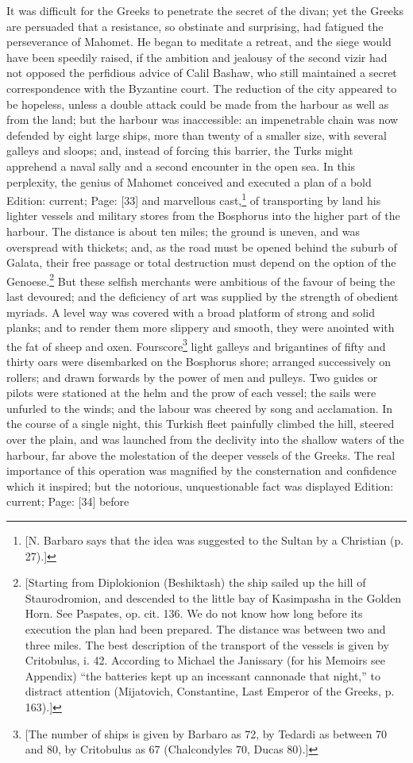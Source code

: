 It was difficult for the Greeks to penetrate the secret of the divan; yet the Greeks are persuaded that a resistance, so obstinate and surprising, had fatigued the perseverance of Mahomet. He began to meditate a retreat, and the siege would have been speedily raised, if the ambition and jealousy of the second vizir had not opposed the perfidious advice of Calil Bashaw, who still maintained a secret correspondence with the Byzantine court. The reduction of the city appeared to be hopeless, unless a double attack could be made from the harbour as well as from the land; but the harbour was inaccessible: an impenetrable chain was now defended by eight large ships, more than twenty of a smaller size, with several galleys and sloops; and, instead of forcing this barrier, the Turks might apprehend a naval sally and a second encounter in the open sea. In this perplexity, the genius of Mahomet conceived and executed a plan of a bold Edition: current; Page: [33] and marvellous cast,\footnote{[N. Barbaro says that the idea was suggested to the Sultan by a Christian (p. 27).]} of transporting by land his lighter vessels and military stores from the Bosphorus into the higher part of the harbour. The distance is about ten miles; the ground is uneven, and was overspread with thickets; and, as the road must be opened behind the suburb of Galata, their free passage or total destruction must depend on the option of the Genoese.\footnote{[Starting from Diplokionion (Beshiktash) the ship sailed up the hill of Staurodromion, and descended to the little bay of Kasimpasha in the Golden Horn. See Paspates, op. cit. 136. We do not know how long before its execution the plan had been prepared. The distance was between two and three miles. The best description of the transport of the vessels is given by Critobulus, i. 42. According to Michael the Janissary (for his Memoirs see Appendix) \texthebrew{“}the batteries kept up an incessant cannonade that night,\texthebrew{}” to distract attention (Mijatovich, Constantine, Last Emperor of the Greeks, p. 163).]} But these selfish merchants were ambitious of the favour of being the last devoured; and the deficiency of art was supplied by the strength of obedient myriads. A level way was covered with a broad platform of strong and solid planks; and to render them more slippery and smooth, they were anointed with the fat of sheep and oxen. Fourscore\footnote{[The number of ships is given by Barbaro as 72, by Tedardi as between 70 and 80, by Critobulus as 67 (Chalcondyles 70, Ducas 80).]} light galleys and brigantines of fifty and thirty oars were disembarked on the Bosphorus shore; arranged successively on rollers; and drawn forwards by the power of men and pulleys. Two guides or pilots were stationed at the helm and the prow of each vessel; the sails were unfurled to the winds; and the labour was cheered by song and acclamation. In the course of a single night, this Turkish fleet painfully climbed the hill, steered over the plain, and was launched from the declivity into the shallow waters of the harbour, far above the molestation of the deeper vessels of the Greeks. The real importance of this operation was magnified by the consternation and confidence which it inspired; but the notorious, unquestionable fact was displayed Edition: current; Page: [34] before 